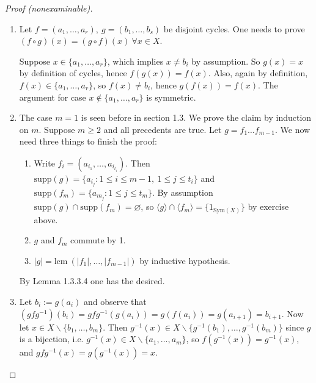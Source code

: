 \documentclass[a4paper]{article}
\newcommand{\Sym}{\text{Sym}}
\newcommand{\supp}{\text{supp}}
\newcommand{\lcm}{\text{lcm}\ }
\theoremstyle{definition}
\begin{document}
\begin{proof}[Proof (nonexaminable)]
\begin{enumerate}
\item Let $f=(a_1,\ldots,a_r),\ g=(b_1,\ldots,b_s)$ be disjoint cycles. One needs to prove $(f\circ g)(x)=(g\circ f)(x) \ \forall x\in X$.

Suppose $x\in\{a_1,\ldots,a_r\}$, which implies $x\neq b_i$ by assumption. So $g(x)=x$ by definition of cycles, hence $f(g(x))=f(x)$. Also, again by definition, $f(x)\in\{a_1,\ldots,a_r\}$, so $f(x)\neq b_i$, hence $g(f(x))=f(x)$. The argument for case $x\notin \{a_1,\ldots,a_r\}$ is symmetric.
\item The case $m=1$ is seen before in section 1.3. We prove the claim by induction on $m$. Suppose $m\geq 2$ and all precedents are true. Let $g=f_1\ldots f_{m-1}$. We now need three things to finish the proof:
\begin{enumerate}
\item Write $f_i=(a_{i_1},\ldots,a_{i_{t_i}})$. Then $\supp(g)=\{a_{i_j}:1\leq i\leq m-1,\ 1\leq j\leq t_i\}$ and $\supp(f_m)=\{a_{m_j}:1\leq j\leq t_m\}$. By assumption $\supp(g)\cap\supp(f_m)=\varnothing$, so $\langle g\rangle \cap \langle f_m\rangle=\{1_{\Sym(X)}\}$ by exercise above.
\item $g$ and $f_m$ commute by 1.
\item $|g|=\lcm(|f_1|,\ldots,|f_{m-1}|)$ by inductive hypothesis.
\end{enumerate}
By Lemma 1.3.3.4 one has the desired.
\item Let $b_i:=g(a_i)$ and observe that $(gfg^{-1})(b_i)=gfg^{-1}(g(a_i))=g(f(a_i))=g(a_{i+1})=b_{i+1}$. Now let $x\in X\backslash\{b_1,\ldots,b_m\}$. Then $g^{-1}(x)\in X\backslash\{g^{-1}(b_1),\ldots,g^{-1}(b_m)\}$ since $g$ is a bijection, i.e. $g^{-1}(x)\in X\backslash\{a_1,\ldots,a_m\}$, so $f(g^{-1}(x))=g^{-1}(x)$, and $gfg^{-1}(x)=g(g^{-1}(x))=x$.
\end{enumerate}
\end{proof}
\end{document}
